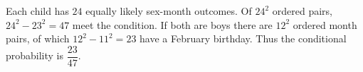 Each child has $24$ equally likely sex-month outcomes. Of $24^2$ ordered pairs, $24^2-23^2=47$ meet the condition. If both are boys there are $12^2$ ordered month pairs, of which $12^2-11^2=23$ have a February birthday. Thus the conditional probability is $\boxed{\dfrac{23}{47}}$.
